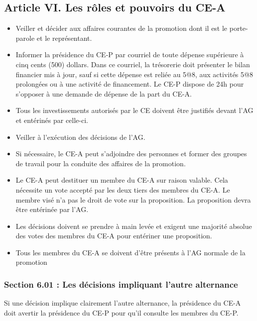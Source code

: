 \subsection*{Article VI. Les rôles et pouvoirs du CE-A}
\begin{itemize}
\item Veiller et décider aux affaires courantes de la promotion dont il est le porte-parole et le représentant.
\item Informer la présidence du CE-P par courriel de toute dépense supérieure à cinq cents (500) dollars. Dans ce courriel, la trésorerie doit présenter le bilan financier mis à jour, sauf si cette dépense est reliée au 5@8, aux activités 5@8 prolongées ou à une activité de financement. Le CE-P dispose de 24h pour s’opposer à une demande de dépense de la part du CE-A.
\item Tous les investissements autorisés par le CE doivent être justifiés devant l'AG et entérinés par celle-ci. 
\item Veiller à l'exécution des décisions de l'AG.
\item Si nécessaire, le CE-A peut s'adjoindre des personnes et former des groupes de travail pour la conduite des affaires de la promotion. 
\item Le CE-A peut destituer un membre du CE-A sur raison valable. Cela nécessite un vote accepté par les deux tiers des membres du CE-A. Le membre visé n’a pas le droit de vote sur la proposition. La proposition devra être entérinée par l’AG. 
\item Les décisions doivent se prendre à main levée et exigent une majorité absolue des votes des membres du CE-A pour entériner une proposition.
\item Tous les membres du CE-A se doivent d’être présents à l’AG normale de la promotion
\end{itemize}

\subsubsection*{Section 6.01 : Les décisions impliquant l'autre alternance}
Si une décision implique clairement l’autre alternance, la présidence du CE-A doit avertir la présidence du CE-P pour qu’il consulte les membres du CE-P. \\

